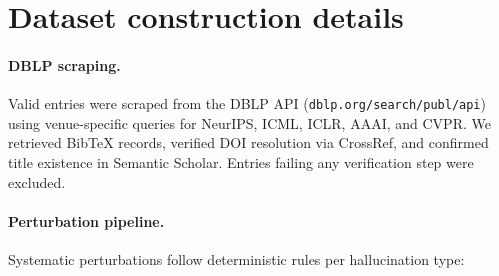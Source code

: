 \section{Dataset construction details}
\label{app:dataset}

\paragraph{DBLP scraping.}
Valid entries were scraped from the DBLP API (\texttt{dblp.org/search/publ/api}) using venue-specific queries for NeurIPS, ICML, ICLR, AAAI, and CVPR.
We retrieved BibTeX records, verified DOI resolution via CrossRef, and confirmed title existence in Semantic Scholar.
Entries failing any verification step were excluded.

\paragraph{Perturbation pipeline.}
Systematic perturbations follow deterministic rules per hallucination type:
